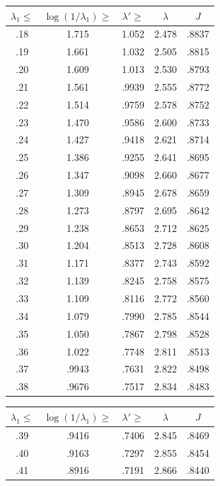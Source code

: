 \documentclass[12pt,psamsfonts]{amsart}
\theoremstyle{definition}
\theoremstyle{remark}
\numberwithin{equation}{section}
\begin{document}
\begin{table}

\begin{tabular}{c|c|c|c|c} 
 $\lambda_1 \leq $ & $\log(1/\lambda_1) \geq $ & $\lambda' \geq $ & $\lambda$ & $J$ \\ 
 \hline 
 .18 &  1.715 &  1.052 &  2.478 &  .8837 \\ 
 .19 &  1.661 &  1.032 &  2.505 &  .8815 \\ 
 .20 &  1.609 &  1.013 &  2.530 &  .8793 \\ 
 .21 &  1.561 &  .9939 &  2.555 &  .8772 \\ 
 .22 &  1.514 &  .9759 &  2.578 &  .8752 \\ 
 .23 &  1.470 &  .9586 &  2.600 &  .8733 \\ 
 .24 &  1.427 &  .9418 &  2.621 &  .8714 \\ 
 .25 &  1.386 &  .9255 &  2.641 &  .8695 \\ 
 .26 &  1.347 &  .9098 &  2.660 &  .8677 \\ 
 .27 &  1.309 &  .8945 &  2.678 &  .8659 \\ 
 .28 &  1.273 &  .8797 &  2.695 &  .8642 \\ 
 .29 &  1.238 &  .8653 &  2.712 &  .8625 \\ 
 .30 &  1.204 &  .8513 &  2.728 &  .8608 \\ 
 .31 &  1.171 &  .8377 &  2.743 &  .8592 \\ 
 .32 &  1.139 &  .8245 &  2.758 &  .8575 \\ 
 .33 &  1.109 &  .8116 &  2.772 &  .8560 \\ 
 .34 &  1.079 &  .7990 &  2.785 &  .8544 \\ 
 .35 &  1.050 &  .7867 &  2.798 &  .8528 \\ 
 .36 &  1.022 &  .7748 &  2.811 &  .8513 \\ 
  .37 &  .9943 &  .7631 &  2.822 &  .8498 \\ 
 .38 &  .9676 &  .7517 &  2.834 &  .8483 \\ 
 \end{tabular}
 \qquad
 \begin{tabular}{c|c|c|c|c} 
 $\lambda_1 \leq $ & $\log(1/\lambda_1) \geq $ & $\lambda' \geq $ & $\lambda$ & $J$ \\ 
 \hline 
  .39 &  .9416 &  .7406 &  2.845 &  .8469 \\ 
 .40 &  .9163 &  .7297 &  2.855 &  .8454 \\ 
 .41 &  .8916 &  .7191 &  2.866 &  .8440 \\ 

\end{tabular}
\end{table}
\end{document}
